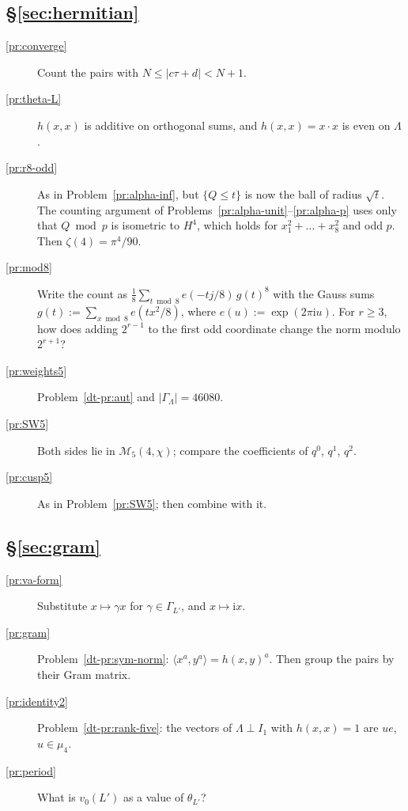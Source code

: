 \documentclass[reqno]{amsart}
\theoremstyle{definition}
\theoremstyle{plain}
\newcommand{\ii}{\mathrm{i}}
\newcommand{\Mf}{\mathcal{M}}
\begin{document}
\subsection*{\S\ref{sec:hermitian}}
\begin{description}
\item[\ref{pr:converge}] Count the pairs with \(N \le \lvert c\tau + d\rvert < N+1\).
\item[\ref{pr:theta-L}] \(h(x,x)\) is additive on orthogonal sums, and \(h(x,x) = x\cdot x\) is even on \(\Lambda\).
\item[\ref{pr:r8-odd}] As in Problem~\ref{pr:alpha-inf}, but \(\{Q \le t\}\) is now the ball of radius \(\sqrt t\).  The counting argument of Problems~\ref{pr:alpha-unit}--\ref{pr:alpha-p} uses only that \(Q \bmod p\) is isometric to \(H^4\), which holds for \(x_1^2 + \dots + x_8^2\) and odd \(p\).  Then \(\zeta(4) = \pi^4/90\).
\item[\ref{pr:mod8}] Write the count as \(\frac18\sum_{t \bmod 8} e(-tj/8)\,g(t)^8\) with the Gauss sums \(g(t) := \sum_{x \bmod 8} e(tx^2/8)\), where \(e(u):=\exp(2\pi\ii u)\).  For \(r\ge3\), how does adding \(2^{r-1}\) to the first odd coordinate change the norm modulo \(2^{r+1}\)?
\item[\ref{pr:weights5}] Problem~\ref{dt-pr:aut} and \(\lvert\Gamma_\Lambda\rvert = 46080\).
\item[\ref{pr:SW5}] Both sides lie in \(\Mf_5(4,\chi)\); compare the coefficients of \(q^0\), \(q^1\), \(q^2\).
\item[\ref{pr:cusp5}] As in Problem~\ref{pr:SW5}; then combine with it.
\end{description}

\subsection*{\S\ref{sec:gram}}
\begin{description}
\item[\ref{pr:va-form}] Substitute \(x \mapsto \gamma x\) for \(\gamma \in \Gamma_{L'}\), and \(x \mapsto \ii x\).
\item[\ref{pr:gram}] Problem~\ref{dt-pr:sym-norm}: \(\langle x^a, y^a\rangle = h(x,y)^a\).  Then group the pairs by their Gram matrix.
\item[\ref{pr:identity2}] Problem~\ref{dt-pr:rank-five}: the vectors of \(\Lambda \perp I_1\) with \(h(x,x) = 1\) are \(ue\), \(u \in \mu_4\).
\item[\ref{pr:period}] What is \(v_0(L')\) as a value of \(\theta_{L'}\)?
\end{description}
\end{document}
